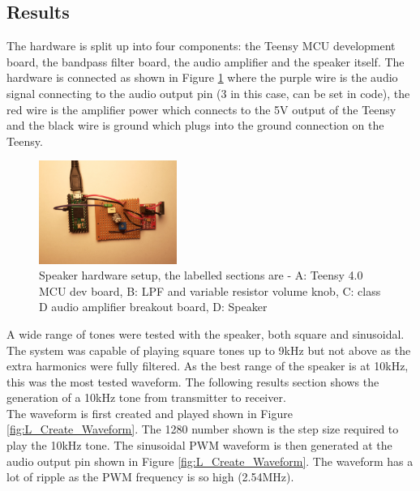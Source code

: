 \documentclass[12pt, a4paper]{article}
\begin{document}
\subsection{Results}
The hardware is split up into four components: the Teensy MCU development board, the bandpass filter board, the audio amplifier and the speaker itself. The hardware is connected as shown in Figure \ref{fig:L_Hardware} where the purple wire is the audio signal connecting to the audio output pin (3 in this case, can be set in code), the red wire is the amplifier power which connects to the 5V output of the Teensy and the black wire is ground which plugs into the ground connection on the Teensy. \\

\begin{figure} [!htb]
	\captionsetup{justification=centering}
	\hfill\includegraphics[width=0.4\textwidth]{./images/speaker/L_Hardware}\hspace{\fill}
	\caption{Speaker hardware setup, the labelled sections are - A: Teensy 4.0 MCU dev board, B: LPF and variable resistor volume knob, C: class D audio amplifier breakout board, D: Speaker}
	\label{fig:L_Hardware}
\end{figure} 

A wide range of tones were tested with the speaker, both square and sinusoidal. The system was capable of playing square tones up to 9kHz but not above as the extra harmonics were fully filtered. As the best range of the speaker is at 10kHz, this was the most tested waveform. The following results section shows the generation of a 10kHz tone from transmitter to receiver. \\

The waveform is first created and played shown in Figure \ref{fig:L_Create_Waveform}. The 1280 number shown is the step size required to play the 10kHz tone. The sinusoidal PWM waveform is then generated at the audio output pin shown in Figure \ref{fig:L_Create_Waveform}. The waveform has a lot of ripple as the PWM frequency is so high (2.54MHz). \\
\end{document}
